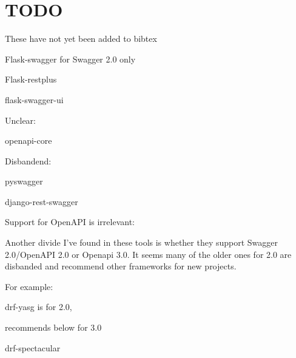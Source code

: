 \documentclass[conference]{IEEEtran}
\begin{document}
\section{TODO}

These have not yet been added to bibtex

Flask-swagger for Swagger 2.0 only \cite{www-flask-swagger}

Flask-restplus \cite{www-flask-restplus,}

flask-swagger-ui \cite{www-flask-swagger-ui}

Unclear:

openapi-core \cite{www-openapi-core}

Disbandend:

pyswagger \cite{www-pyswagger} 

django-rest-swagger \cite{www-django-rest-swagger}


Support for OpenAPI is irrelevant:

 Another divide I've found in these tools is whether they support Swagger 2.0/OpenAPI 2.0 or Openapi 3.0. It seems many of the older ones for 2.0 are disbanded and recommend other frameworks for new projects.



For example:

drf-yasg is for 2.0, \cite{www-drf-yasg}

recommends below for 3.0

drf-spectacular \cite{www-drf-spectacular}

%
%


%


\end{document}
